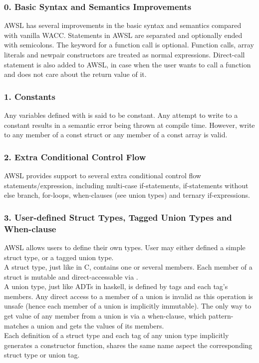 \documentclass[10pt,a4paper]{report}
\begin{document}
  \subsubsection*{0. Basic Syntax and Semantics Improvements}
  AWSL has several improvements in the basic syntax and semantics compared with vanilla WACC. Statements in AWSL are separated and optionally
  ended with semicolons. The  keyword for a function call is optional. Function calls, array literals and newpair constructors 
  are treated as normal expressions. Direct-call statement is also added to AWSL, in case when the user wants to call a function and does not
  care about the return value of it.

  \subsubsection*{1. Constants}
  Any variables defined with  is said to be constant. Any attempt to write to a constant results in a semantic error being thrown at compile time.
  However, write to any member of a const struct or any member of a const array is valid. 

  \subsubsection*{2. Extra Conditional Control Flow}
  AWSL provides support to several extra conditional control flow statements/expression, including multi-case if-statements, if-statements
  without else branch, for-loops, when-clauses (see union types) and ternary if-expressions. 

  \subsubsection*{3. User-defined Struct Types, Tagged Union Types and When-clause}
  AWSL allows users to define their own types. User may either defined a simple struct type, or a tagged union type.\\
  A struct type, just like  in C, contains one or several members. Each member of a struct is mutable and
  direct-accessable via .\\
  A union type, just like ADTs in haskell, is defined by tags and each tag's members. Any direct access to a member of a union is
  invalid as this operation is unsafe (hence each member of a union is implicitly immutable). The only way to get value of any member
  from a union is via a when-clause, which pattern-matches a union and gets the values of its members.\\
  Each definition of a struct type and each tag of any union type implicitly generates a constructor function, shares the same name aspect
  the corresponding struct type or union tag.
\end{document}

